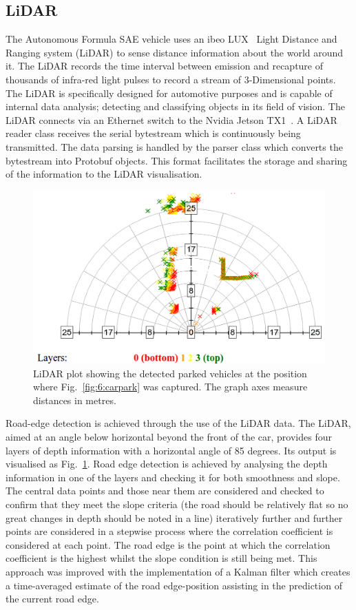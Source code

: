 \subsection{LiDAR}
The Autonomous Formula SAE vehicle uses an ibeo LUX~\cite{autonomoustuff_ibeo_nodate} Light Distance and Ranging system (LiDAR) to sense distance information about the world around it. The LiDAR records the time interval between emission and recapture of thousands of infra-red light pulses to record a stream of 3-Dimensional points. The LiDAR is specifically designed for automotive purposes and is capable of internal data analysis; detecting and classifying objects in its field of vision. The LiDAR connects via an Ethernet switch to the Nvidia Jetson TX1~\cite{nvidia_corporation_embedded_2017-1}. A LiDAR reader class receives the serial bytestream which is continuously being transmitted. The data parsing is handled by the parser class which converts the bytestream into Protobuf objects. This format facilitates the storage and sharing of the information to the LiDAR visualisation.

\begin{figure}[H]
	\centering
	\includegraphics[width=0.8\linewidth]{luxplot}
	\caption[LiDAR plot at the position of Fig.~\ref{fig:6:carpark}]{LiDAR plot showing the detected parked vehicles at the position where Fig.~\ref{fig:6:carpark} was captured. The graph axes measure distances in metres.}
	\label{fig:6:lidar}
\end{figure}

Road-edge detection is achieved through the use of the LiDAR data. The LiDAR, aimed at an angle below horizontal beyond the front of the car, provides four layers of depth information with a horizontal angle of 85 degrees. Its output is visualised as Fig.~\ref{fig:6:lidar}. Road edge detection is achieved by analysing the depth information in one of the layers and checking it for both smoothness and slope. The central data points and those near them are considered and checked to confirm that they meet the slope criteria (the road should be relatively flat so no great changes in depth should be noted in a line) iteratively further and further points are considered in a stepwise process where the correlation coefficient is considered at each point. The road edge is the point at which the correlation coefficient is the highest whilst the slope condition is still being met. This approach was improved with the implementation of a Kalman filter which creates a time-averaged estimate of the road edge-position assisting in the prediction of the current road edge.

